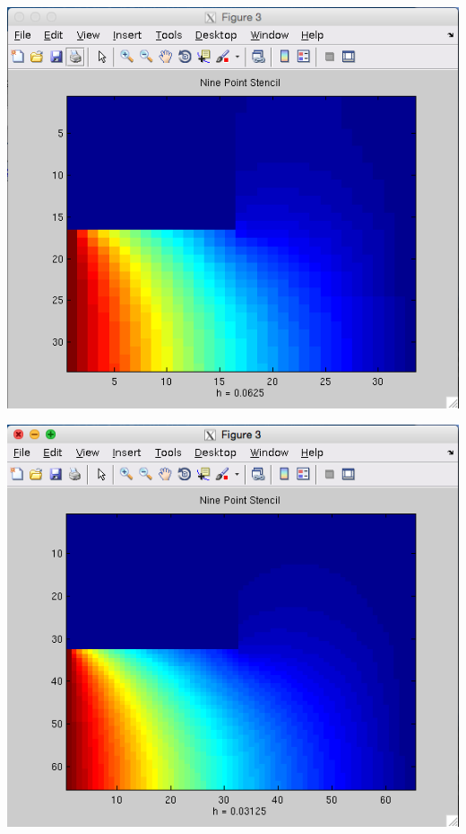 \documentclass[11pt, oneside]{article}   	%
\begin{document}
\centerline{\includegraphics[scale = 0.55]{NinePoint_h4.png}}

\centerline{\includegraphics[scale = 0.55]{NinePoint_h5.png}}
\end{document}
